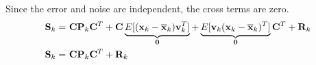 Since the error and noise are independent, the cross terms are zero.
\begin{align*}
  \mathbf{S}_k =~& \mathbf{C}\mathbf{P}_k\mathbf{C}^T +
    \mathbf{C}\underbrace{E[(\mathbf{x}_k - \overline{\mathbf{x}}_k)\mathbf{v}_k^T]}_{\mathbf{0}} +
    \underbrace{
      E[\mathbf{v}_k(\mathbf{x}_k - \overline{\mathbf{x}}_k)^T]}_{\mathbf{0}}\mathbf{C}^T + \mathbf{R}_k \\
  \mathbf{S}_k =~& \mathbf{C}\mathbf{P}_k\mathbf{C}^T + \mathbf{R}_k
\end{align*}
